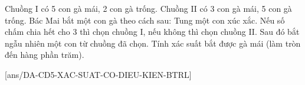 \begin{vd} %
    Chuồng I có 5 con gà mái, 2 con gà trống. Chuồng II có 3 con gà mái, 5 con gà trống. Bác Mai bắt một con gà theo cách sau: Tung một con xúc xắc. Nếu số chấm chia hết cho 3 thì chọn chuồng I, nếu không thì chọn chuồng II. Sau đó bắt ngẫu nhiên một con từ chuồng đã chọn. Tính xác suất bắt được gà mái (làm tròn đến hàng phần trăm). 
\end{vd}
[ans/DA-CD5-XAC-SUAT-CO-DIEU-KIEN-BTRL]
